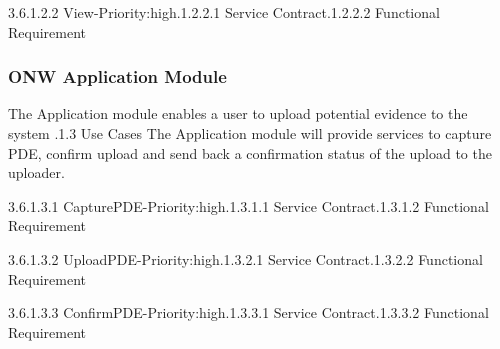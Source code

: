 \documentclass[a4paper,12pt]{article}
\begin{document}
3.6.1.2.2 View-Priority:high.1.2.2.1 Service Contract.1.2.2.2 Functional Requirement\newline
	
\subsubsection {ONW Application Module}

The  Application module enables a user to upload potential evidence to the system .1.3 Use Cases\newline
The Application module will provide services to capture PDE, confirm upload and send back a confirmation status of the upload to the uploader.\newline

3.6.1.3.1 CapturePDE-Priority:high.1.3.1.1 Service Contract.1.3.1.2 Functional Requirement\newline


3.6.1.3.2 UploadPDE-Priority:high.1.3.2.1 Service Contract.1.3.2.2 Functional Requirement\newline
	
3.6.1.3.3 ConfirmPDE-Priority:high.1.3.3.1 Service Contract.1.3.3.2 Functional Requirement\newline
\end{document}
